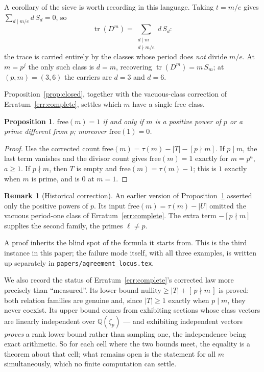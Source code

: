 \documentclass[11pt]{article}
\theoremstyle{plain}
\newtheorem{proposition}[theorem]{Proposition}
\theoremstyle{definition}
\newtheorem{remark}[theorem]{Remark}
\newcommand{\QQ}{\mathbb Q}
\newcommand{\tr}{\operatorname{tr}}
\begin{document}
A corollary of the sieve is worth recording in this language. Taking $t=m/e$
gives $\sum_{d\mid m/e}d\,S_d=0$, so
\[
\tr(D^m)=\sum_{\substack{d\mid m\\ d\nmid m/e}} d\,S_d :
\]
the trace is carried entirely by the classes whose period does \emph{not}
divide $m/e$. At $m=p^{j}$ the only such class is $d=m$, recovering
$\tr(D^m)=m\,S_m$; at $(p,m)=(3,6)$ the carriers are $d=3$ and $d=6$.

Proposition~\ref{prop:closed}, together with the vacuous-class correction of
Erratum~\ref{err:complete}, settles which $m$ have a single free class.

\begin{proposition}\label{prop:freeone}
$\mathrm{free}(m)=1$ if and only if $m$ is a positive power of $p$ or a prime
different from $p$; moreover $\mathrm{free}(1)=0$.
\end{proposition}

\begin{proof}
Use the corrected count
$\mathrm{free}(m)=\tau(m)-\lvert T\rvert-[p\nmid m]$.  If $p\mid m$, the
last term vanishes and the divisor count gives $\mathrm{free}(m)=1$ exactly
for $m=p^a$, $a\ge1$.  If $p\nmid m$, then $T$ is empty and
$\mathrm{free}(m)=\tau(m)-1$; this is $1$ exactly when $m$ is prime, and is
$0$ at $m=1$.
\end{proof}

\begin{remark}[Historical correction]\label{err:freeone}
An earlier version of Proposition~\ref{prop:freeone} asserted only the
positive powers of $p$.  Its input
$\mathrm{free}(m)=\tau(m)-\lvert U\rvert$ omitted the vacuous period-one class
of Erratum~\ref{err:complete}.  The extra term $-[p\nmid m]$ supplies the
second family, the primes $\ell\neq p$.

A proof inherits the blind spot of the formula it starts from. This is the
third instance in this paper; the failure mode itself, with all three examples,
is written up separately in \texttt{papers/agreement\_locus.tex}.
\end{remark}

We also record the status of Erratum~\ref{err:complete}'s corrected law more
precisely than ``measured''. Its lower bound
$\text{nullity}\ge\lvert T\rvert+[\,p\nmid m\,]$ is proved: both relation
families are genuine and, since $\lvert T\rvert\ge1$ exactly when $p\mid m$,
they never coexist. Its upper bound comes from exhibiting sections whose class
vectors are linearly independent over $\QQ(\zeta_p)$ --- and exhibiting
independent vectors \emph{proves} a rank lower bound rather than sampling one,
the independence being exact arithmetic. So for each cell where the two bounds
meet, the equality is a theorem about that cell; what remains open is the
statement for all $m$ simultaneously, which no finite computation can settle.
\end{document}
